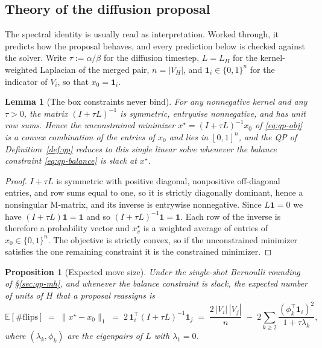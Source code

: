 \documentclass[11pt]{article}
\newtheorem{lemma}{Lemma}[section]
\newtheorem{proposition}{Proposition}[section]
\newcommand{\E}{\mathbb{E}}
\begin{document}
\subsection{Theory of the diffusion proposal}\label{sec:diffusion-theory}

The spectral identity is usually read as interpretation. Worked
through, it predicts how the proposal behaves, and every prediction
below is checked against the solver. Write $\tau := \alpha/\beta$ for
the diffusion timestep, $L = L_H$ for the kernel-weighted Laplacian of
the merged pair, $n = |V_H|$, and $\mathbf{1}_i \in \{0,1\}^{n}$ for
the indicator of $V_i$, so that $x_0 = \mathbf{1}_i$.

\begin{lemma}[The box constraints never bind]\label{lem:row-stochastic}
For any nonnegative kernel and any $\tau > 0$, the matrix
$(I + \tau L)^{-1}$ is symmetric, entrywise nonnegative, and has unit
row sums. Hence the unconstrained minimizer
$x^\star = (I + \tau L)^{-1} x_0$ of \eqref{eq:qp-obj} is a convex
combination of the entries of $x_0$ and lies in $[0,1]^{n}$, and the
QP of Definition~\ref{def:qp} reduces to this single linear solve
whenever the balance constraint \eqref{eq:qp-balance} is slack at
$x^\star$.
\end{lemma}

\begin{proof}
$I + \tau L$ is symmetric with positive diagonal, nonpositive
off-diagonal entries, and row sums equal to one, so it is strictly
diagonally dominant, hence a nonsingular M-matrix, and its inverse is
entrywise nonnegative. Since $L\mathbf{1} = 0$ we have
$(I + \tau L)\mathbf{1} = \mathbf{1}$ and so
$(I + \tau L)^{-1}\mathbf{1} = \mathbf{1}$. Each row of the inverse is
therefore a probability vector and $x^\star_v$ is a weighted average of
entries of $x_0 \in \{0,1\}^n$. The objective is strictly convex, so if
the unconstrained minimizer satisfies the one remaining constraint it
is the constrained minimizer.
\end{proof}

\begin{proposition}[Expected move size]\label{prop:move-size}
Under the single-shot Bernoulli rounding of \S\ref{sec:qp-mh}, and
whenever the balance constraint is slack, the expected number of units
of $H$ that a proposal reassigns is
\begin{equation}\label{eq:move-size}
  \E[\#\mathrm{flips}]
  \;=\; \|x^\star - x_0\|_1
  \;=\; 2\,\mathbf{1}_i^{\top}(I + \tau L)^{-1}\mathbf{1}_j
  \;=\; \frac{2\,|V_i|\,|V_j|}{n}
        \;-\; 2\sum_{k \ge 2}\frac{(\phi_k^{\top}\mathbf{1}_i)^2}{1 + \tau\lambda_k},
\end{equation}
where $(\lambda_k, \phi_k)$ are the eigenpairs of $L$ with
$\lambda_1 = 0$.
\end{proposition}
\end{document}
